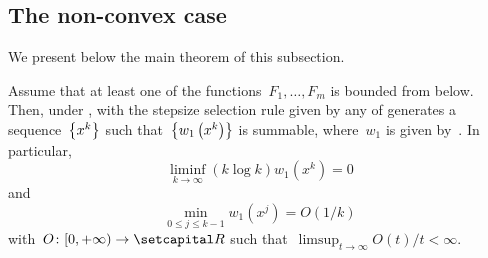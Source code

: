 \documentclass[../../main]{subfiles}
\begin{document}
\subsection{The non-convex case}
We present below the main theorem of this subsection.
\begin{theorem} 
    Assume that at least one of the functions~$F_1, \dots, F_m$ is bounded from below.
    Then, under ,  with the stepsize selection rule given by any of  generates a sequence~$\set*{x^k}$ such that~$\set*{w_1\left(x^k\right)}$ is summable, where~$w_1$ is given by~.
    In particular,
    \begin{equation}
        \liminf_{k \to \infty} (k \log k) w_1\left(x^k\right) = 0
    \end{equation} 
    and
    \begin{equation}
        \min_{0 \le j \le k - 1} w_1\left(x^j\right) = O(1 / k)
    \end{equation} 
    with~$O \colon [0, + \infty) \to \setR$ such that~$\limsup_{t \to \infty} O(t) / t < \infty$.
\end{theorem}
\end{document}
